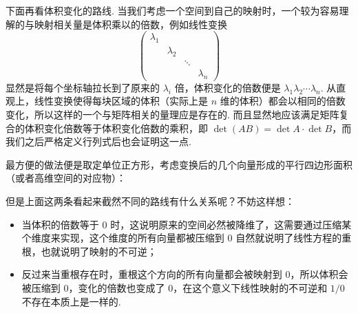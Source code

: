 下面再看体积变化的路线. 当我们考虑一个空间到自己的映射时，一个较为容易理解的与映射相关量是体积乘以的倍数，例如线性变换
\[
\begin{pmatrix}
\lambda_1 \\ & \lambda_2 \\ && \ddots \\ &&& \lambda_n
\end{pmatrix}
\]
显然是将每个坐标轴拉长到了原来的 $\lambda_i$ 倍，体积变化的倍数便是 $\lambda_1 \lambda_2 \cdots \lambda_n$. 从直观上，线性变换使得每块区域的体积（实际上是 $n$ 维的体积）都会以相同的倍数变化，所以这样的一个与矩阵相关的量理应是存在的. 而且显然地应该满足矩阵复合的体积变化倍数等于体积变化倍数的乘积，即 $\det(AB) = \det A \cdot \det B$，而我们之后严格定义行列式后也会证明这一点.

最方便的做法便是取定单位正方形，考虑变换后的几个向量形成的平行四边形面积（或者高维空间的对应物）：

\begin{figure}[htbp]
    \centering
\end{figure}

但是上面这两条看起来截然不同的路线有什么关系呢？不妨这样想：
\begin{itemize}
    \item 当体积的倍数等于 $0$ 时，这说明原来的空间必然被降维了，这需要通过压缩某个维度来实现，这个维度的所有向量都被压缩到 $0$ 自然就说明了线性方程的重根，也就说明了映射的不可逆；
    \item 反过来当重根存在时，重根这个方向的所有向量都会被映射到 $0$，所以体积会被压缩到 $0$，变化的倍数也变成了 $0$，在这个意义下线性映射的不可逆和 $1/0$ 不存在本质上是一样的.
\end{itemize}

